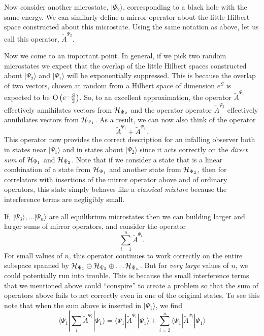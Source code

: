 \documentclass[12pt]{article}
\newcommand{\cop}[1]{#1}
\newcommand{\al}{\cop{A}} %
\def\tal{\widetilde{\al}} %
\def\hilb[#1]{{\cal H}_{#1}}
\def\Or[#1]{{\text{O}}\left({#1}\right)}
\newcommand{\be}{\begin{equation}}
\newcommand{\ee}{\end{equation}}
\begin{document}
Now consider another microstate, $|\Psi_2 \rangle$, corresponding to a black hole with the same energy. We can similarly define a mirror operator about the little Hilbert space constructed about this microstate. Using the same notation as above,  let us call this operator, $\tal^{\Psi_2}$.

Now we come to an important point. In general, if we pick two random microstates we expect that the overlap of the little Hilbert spaces constructed about $|\Psi_2 \rangle$ and $|\Psi_1 \rangle$ will be exponentially suppressed. This is because the overlap of two vectors, chosen at random from a Hilbert space of dimension $e^{S}$ is expected to be $\Or[e^{-{S\over 2}}]$.  So, to an excellent approximation, the operator $\tal^{\Psi_1}$ effectively annihilates  vectors from $\hilb[\Psi_2]$ and the operator  operator $\tal^{\Psi_2}$ effectively annihilates vectors from $\hilb[\Psi_1]$.  As a result,  we can now also think of the operator
\[
\tal^{\Psi_1} + \tal^{\Psi_2}.
\]
This operator now provides the correct description for an infalling observer both in states near $|\Psi_1 \rangle$ and in states about $|\Psi_2 \rangle$ since it acts correctly on the {\em direct sum} of $\hilb[\Psi_1]$ and $\hilb[\Psi_2]$.  Note that if we consider a state that is a linear combination of a state from $\hilb[\Psi_1]$ and another state from $\hilb[\Psi_2]$, then for correlators with insertions of the mirror operator above and of ordinary operators, this state simply behaves like a {\em classical mixture} because the interference terms are negligibly small.

If, $|\Psi_3 \rangle, \ldots |\Psi_n \rangle$ are all equilibrium microstates then we can building larger and larger sums of mirror operators, and consider the operator
\[
\sum_{i=1}^n \tal^{\Psi_i}.
\]
For small values of $n$, this operator continues to work correctly on the entire subspace spanned by $\hilb[\Psi_1] \oplus \hilb[\Psi_2] \oplus \ldots \hilb[\Psi_n]$. But for {\em very large} values of $n$, we could potentially run into trouble. This is because the small interference terms that we mentioned above could ``conspire'' to create a problem so that the sum of operators above fails to act correctly even in one of the original states. To see this note that when the sum above is inserted in $|\Psi_1 \rangle$, we find
\be
\label{sumopinsertion}
\langle \Psi_{1} | \sum_i \tal^{\Psi_i} |\Psi_{1} \rangle
= \langle \Psi_1 | \tal^{\Psi_1} | \Psi_1 \rangle + \sum_{i=2}^n \langle \Psi_{1} |\tal^{\Psi_i} | \Psi_1 \rangle
\ee
\end{document}

